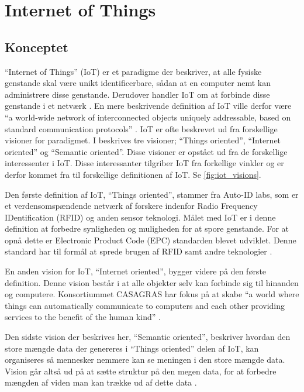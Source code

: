 \section{Internet of Things} %
\label{sec:internet_of_things}

\subsection{Konceptet}
\label{sub:iot_koncept}


\enquote{Internet of Things} (IoT) er et paradigme der beskriver, at alle fysiske genstande skal være unikt identificerbare, sådan at en computer nemt kan administrere disse genstande. Derudover handler IoT om at forbinde disse genstande i et netværk \cite{kopetz2011real}. En mere beskrivende definition af IoT ville derfor være \enquote{a world-wide network of interconnected objects uniquely addressable, based on standard communication protocols} \cite{iot_survey_2010}. IoT er ofte beskrevet ud fra forskellige visioner for paradigmet. I \cite{iot_survey_2010}  beskrives tre visioner; \enquote{Things oriented}, \enquote{Internet oriented} og \enquote{Semantic oriented}. Disse visioner er opstået ud fra de forskellige interessenter i IoT. Disse interessanter tilgriber IoT fra forkellige vinkler og er derfor kommet fra til forskellige definitionen af IoT. Se \cref{fig:iot_visions}.


Den første definition af IoT, \enquote{Things oriented}, stammer fra Auto-ID labs, som er et verdensomspændende netværk af forskere indenfor Radio Frequency IDentification (RFID) og anden sensor teknologi. Målet med IoT er i denne definition at forbedre synligheden og muligheden for at spore genstande. For at opnå dette er Electronic Product Code (EPC) standarden blevet udviklet. Denne standard har til formål at sprede brugen af RFID samt andre teknologier \cite{iot_survey_2010}.

En anden vision for IoT, \enquote{Internet oriented}, bygger videre på den første definition. Denne vision består i at alle objekter selv kan forbinde sig til hinanden og computere. Konsortiummet CASAGRAS har fokus på at skabe \enquote{a world where things can automatically communicate to computers and each other providing services to the benefit of the human kind} \cite{iot_survey_2010}.


Den sidste vision der beskrives her, \enquote{Semantic oriented}, beskriver hvordan den store mængde data der genereres i \enquote{Things oriented} delen af IoT, kan organiseres så mennesker nemmere kan se meningen i den store mængde data. Vision går altså ud på at sætte struktur på den megen data, for at forbedre mængden af viden man kan trække ud af dette data \cite{iot_semantics_2012}.


